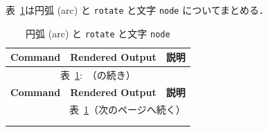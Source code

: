 \documentclass[lualatex]{jlreq}
\begin{document}
表~\ref{tab:arcrotate}は円弧 (arc) と \texttt{rotate} と文字 \texttt{node} についてまとめる．
\begin{longtable}{p{\cwA} p{\cwB} p{\cwC}}
    \caption{円弧 (arc) と \texttt{rotate} と文字 \texttt{node}} \label{tab:arcrotate} \\[-1em]
    \toprule
    \textbf{Command} & \textbf{Rendered Output} & \textbf{説明}                    \\
    \midrule
    \endfirsthead %

    \multicolumn{3}{c}{表~\ref{tab:arcrotate}:~\nameref{tab:arcrotate}（の続き）}      \\[0.3em]
    \toprule
    \textbf{Command} & \textbf{Rendered Output} & \textbf{説明}                    \\
    \midrule
    \endhead %

    \multicolumn{3}{r}{表~\ref{tab:arcrotate}（次のページへ続く）}                          \\
    \midrule
    \endfoot %

    \midrule
    \multicolumn{3}{r}{表~\ref{tab:arcrotate}終了}                                  \\
    \bottomrule
    \endlastfoot %


\end{longtable}
\end{document}
